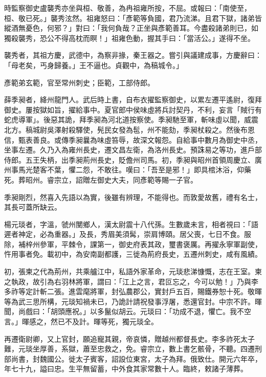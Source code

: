 \begin{pinyinscope}
 時監察御史盧襲秀亦坐與桓、敬善，為冉祖雍所按，不屈。或報曰：「南使至，桓、敬已死。」襲秀泫然。祖雍怒曰：「彥範等負國，君乃流涕。且君下獄，諸弟皆縱酒無憂色，何邪？」對曰：「我何負哉？正坐與彥範善耳。今盡殺諸弟則已，如獨殺襲秀，恐公不得高枕而瞑！」祖雍色動，握其手曰：「當活公。」遂得不坐。



 襲秀者，其祖方慶，武德中，為察非掾，秦王器之。嘗引與議建成事，方慶辭曰：「母老矣，丐身歸養。」王不逼也。貞觀中，為稿城令。」



 彥範弟玄範，官至常州刺史；臣範，工部侍郎。



 薛季昶者，絳州龍門人。武后時上書，自布衣擢監察御史，以累左遷平遙尉，復拜御史。屢按獄如旨，擢給事中。夏官郎中侯味虛將兵討契丹，不利，妄言「賊行有蛇虎導軍」。後惡其詭，拜季昶為河北道按察使。季昶馳至軍，斬味虛以聞，威震北方。稿城尉吳澤射殺驛使，髡民女發為髢，州不能劾，季昶杖殺之。然後布恩信，甄表善良。或傳季昶曩為味虛笞辱，故深文報怨。自給事中數月為御史中丞，坐事左遷。久乃入為雍州長史，遷文昌左衛，為洛州長史。預誅易之等功，進戶部侍郎。五王失柄，出季昶荊州長史，貶儋州司馬。初，季昶與昭州首領周慶立、廣州事馬光楚客不葉，懼二怨，不敢往。嘆曰：「吾至是邪！」即具棺沐浴，仰藥死。葬昭州。睿宗立，詔贈左御史大夫，同彥範等賜一子官。



 季昶剛烈，然喜入先語以為實，後雖有辨理，不能得也。而敦愛故舊，禮有名士，其長可蓋所缺云。



 楊元琰者，字溫，虢州閺鄉人，漢太尉震十八代孫。生數歲未言，相者視曰：「語遲者神定，必為重器。」及長，秀眉美須髯，崇肩博頤。居父喪，七日不食。服除，補梓州參軍，平棘令，課第一，御史府表其政，璽書褒厲。再擢永寧軍副使，忤用事者免。載初中，為安南副都護，三徙為荊府長史，五遷州刺史，咸有風績。



 初，張柬之代為荊州，共乘艫江中，私語外家革命，元琰悲涕慷慨，志在王室。柬之執政，故引為右羽林將軍，謂曰：「江上之言，君叵忘之，今可以勉！」乃與李多祚等定計斬二張。進雲麾將軍，封弘農郡公，實封戶五百，賜鐵券恕十死。敬暉等為武三思所構，元琰知禍未已，乃詭計請祝發事浮屠，悉還官封。中宗不許。暉聞，尚戲曰：「胡頭應祝。」以多鬣似胡云。元琰曰：「功成不退，懼亡。我不空言。」暉感之，然已不及計。暉等死，獨元琰全。



 再遷衛尉卿，又上官封，願追寵其親，帝哀憐，贈越州都督長史。李多祚死太子難，元琰坐厚善，系獄，蕭至忠救之，免。睿宗立，數上書乞骸骨，不聽。四遷刑部尚書，封魏國公。徙太子賓客，詔設位東宮，太子為拜。俄致仕。開元六年卒，年七十九，謚曰忠。生平無留蓄，中外食其家常數十人。臨終，敕諸子薄葬。




\end{pinyinscope}
